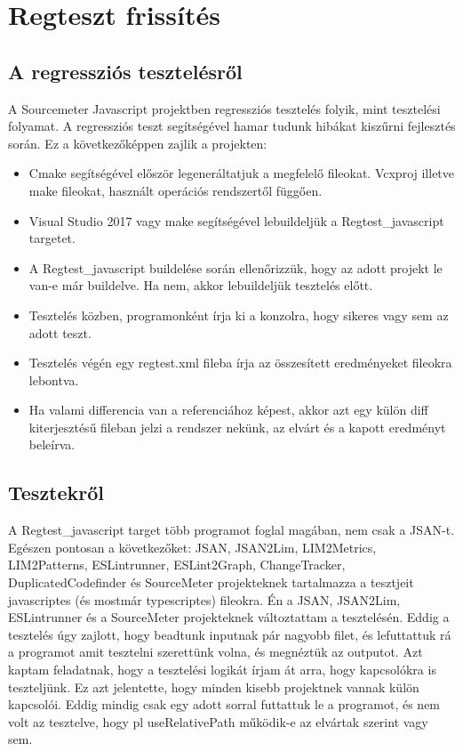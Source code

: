 \chapter{Regteszt frissítés}\label{chap:Regteszt_frissítés}

\section{A regressziós tesztelésről}

\noindent

A Sourcemeter Javascript projektben regressziós tesztelés folyik, mint tesztelési folyamat.
A regressziós teszt segítségével hamar tudunk hibákat kiszűrni fejlesztés során.
Ez a következőképpen zajlik a projekten:

\begin{itemize}
      \item Cmake segítségével először legeneráltatjuk a megfelelő fileokat. Vcxproj illetve make fileokat, használt operációs rendszertől függően.
      \item Visual Studio 2017 vagy make segítségével lebuildeljük a Regtest\_javascript targetet.
      \item A Regtest\_javascript buildelése során ellenőrizzük, hogy az adott projekt le van-e már buildelve. Ha nem, akkor lebuildeljük tesztelés előtt.
      \item Tesztelés közben, programonként írja ki a konzolra, hogy sikeres vagy sem az adott teszt.
      \item Tesztelés végén egy regtest.xml fileba írja az összesített eredményeket fileokra lebontva.
      \item Ha valami differencia van a referenciához képest, akkor azt egy külön diff kiterjesztésű fileban jelzi a rendszer nekünk, az elvárt és a kapott eredményt beleírva.
\end{itemize}

\section{Tesztekről}

\noindent

A Regtest\_javascript target több programot foglal magában, nem csak a JSAN-t. Egészen pontosan a következőket:
JSAN, JSAN2Lim, LIM2Metrics, LIM2Patterns, ESLintrunner, ESLint2Graph, ChangeTracker, DuplicatedCodefinder és SourceMeter projekteknek tartalmazza a tesztjeit javascriptes (és mostmár typescriptes) fileokra.
Én a JSAN, JSAN2Lim, ESLintrunner és a SourceMeter projekteknek változtattam a tesztelésén.
Eddig a tesztelés úgy zajlott, hogy beadtunk inputnak pár nagyobb filet, és lefuttattuk rá a programot amit tesztelni szerettünk volna, és megnéztük az outputot.
Azt kaptam feladatnak, hogy a tesztelési logikát írjam át arra, hogy kapcsolókra is teszteljünk.
Ez azt jelentette, hogy minden kisebb projektnek vannak külön kapcsolói. Eddig mindig csak egy adott sorral futtattuk le a programot, és nem volt az tesztelve, hogy pl useRelativePath működik-e az elvártak szerint vagy sem.


